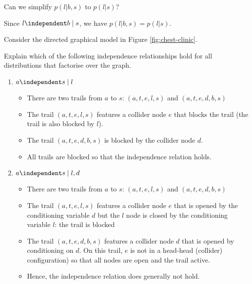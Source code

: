 \begin{exenumerate}
\begin{enumerate}
  \end{enumerate}
  
\item Can we simplify $p(l|b,s)$ to $p(l|s)$?

  \begin{solution}
    Since $l \independent b \mid s$, we have $p(l|b,s) = p(l|s)$.
  \end{solution}

\end{exenumerate}


\label{ex:chest-clinic2}
Consider the directed graphical model in Figure \ref{fig:chest-clinic}.

\begin{exenumerate}
\item Explain which of the following independence relationships hold for all distributions that factorise over the graph.
  \begin{enumerate}
\item $a \independent s \mid l$
  \begin{solution}
    \begin{itemize}
      \item There are two trails from $a$ to $s$: $(a,t,e,l,s)$ and $(a,t,e,d,b,s)$
      \item The trail $(a,t,e,l,s)$ features a collider node $e$ that blocks the trail (the trail is also blocked by $l$).
      \item The trail $(a,t,e,d,b,s)$ is blocked by the collider node $d$. 
      \item All trails are blocked so that the independence relation holds.
    \end{itemize}
  \end{solution}
  
\item $a \independent s \mid l, d$

  \begin{solution}
    \begin{itemize}
      \item There are two trails from $a$ to $s$: $(a,t,e,l,s)$ and $(a,t,e,d,b,s)$
      \item The trail $(a,t,e,l,s)$ features a collider node $e$ that is opened by the conditioning variable $d$ but the $l$ node is closed by the conditioning variable $l$: the trail is blocked
      \item The trail $(a,t,e,d,b,s)$ features a collider node $d$ that is opened by conditioning on $d$. On this trail, $e$ is not in a head-head (collider) configuration) so that all nodes are open and the trail active.
      \item Hence, the independence relation does generally not hold.
    \end{itemize}
  \end{solution}          
  

\end{enumerate}
\end{exenumerate}
